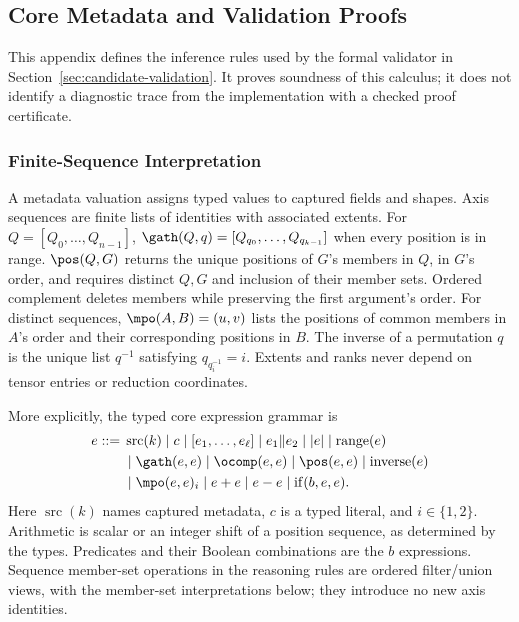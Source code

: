 \subsection{Core Metadata and Validation Proofs}
\label{app:validation-proofs}
This appendix defines the inference rules used by the formal validator in
Section~\ref{sec:candidate-validation}. It proves soundness of this calculus;
it does not identify a diagnostic trace from the implementation with a
checked proof certificate.

\subsubsection{Finite-Sequence Interpretation}
A metadata valuation assigns typed values to captured fields and shapes.
Axis sequences are finite lists of identities with associated extents. For $Q=[Q_0,\ldots,Q_{n-1}]$,
$\gath(Q,q)=[Q_{q_0},\ldots,Q_{q_{k-1}}]$ when every position is in range.
$\pos(Q,G)$ returns the unique positions of $G$'s members in $Q$, in $G$'s
order, and requires distinct $Q,G$ and inclusion of their member sets.
Ordered complement deletes members while preserving the first argument's
order. For distinct sequences, $\mpo(A,B)=(u,v)$ lists the positions of
common members in $A$'s order and their corresponding positions in $B$.
The inverse of a permutation $q$ is the unique list $q^{-1}$ satisfying
$q_{q^{-1}_i}=i$. Extents and ranks never depend on tensor entries or
reduction coordinates.

More explicitly, the typed core expression grammar is
\begin{equation}
\begin{aligned}
 e::={}&\operatorname{src}(k)\mid c\mid[e_1,\ldots,e_\ell]
       \mid e_1\Vert e_2\mid |e|\mid\operatorname{range}(e)\\
      &\mid\gath(e,e)\mid\ocomp(e,e)\mid\pos(e,e)
       \mid\operatorname{inverse}(e)\\
      &\mid\mpo(e,e)_i\mid e+e\mid e-e
       \mid\operatorname{if}(b,e,e).
\end{aligned}
\end{equation}
Here $\operatorname{src}(k)$ names captured metadata, $c$ is a typed
literal, and $i\in\{1,2\}$. Arithmetic is scalar or an integer shift of a
position sequence, as determined by the types. Predicates and their Boolean
combinations are the $b$ expressions. Sequence member-set operations in
the reasoning rules are ordered filter/union views, with the member-set
interpretations below; they introduce no new axis identities.

